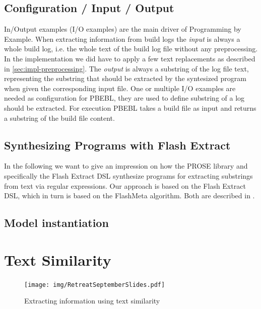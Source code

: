 \documentclass[\myrootdir/main.tex]{subfiles}
\begin{document}
\subsection*{Configuration / Input / Output}
In/Output examples (I/O examples) are the main driver of Programming by Example.
When extracting information from build logs the \emph{input} is always a whole build log, i.e. the whole text of the build log file without any preprocessing.
In the implementation we did have to apply a few text replacements as described in \ref{sec:impl-preprocessing}.
The \emph{output} is always a substring of the log file text, representing the substring that should be extracted by the syntesized program when given the corresponding input file.
One or multiple I/O examples are needed as configuration for PBEBL, they are used to define substring of a log should be extracted.
For execution PBEBL takes a build file as input and returns a substring of the build file content.

\subsection*{Synthesizing Programs with Flash Extract}
In the following we want to give an impression on how the PROSE library and specifically the Flash Extract DSL synthesize programs for extracting substrings from text via regular expressions.
Our approach is based on the Flash Extract DSL, which in turn is based on the FlashMeta algorithm. Both are described in .

\subsection*{Model instantiation}


\section{Text Similarity}
\begin{figure}[h]
  \centering
\texttt{[image: img/RetreatSeptemberSlides.pdf]}
  \caption{Extracting information using text similarity}
  \label{fig:text-similarity-explanation}
\end{figure}
\end{document}
